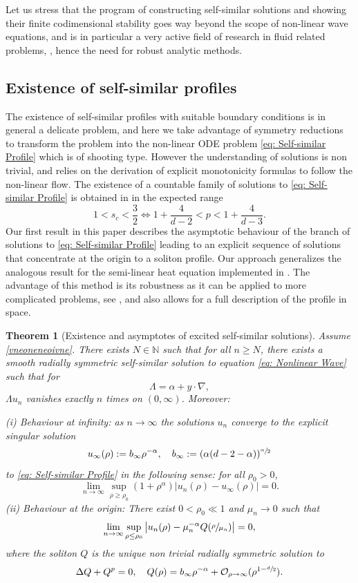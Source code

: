 \documentclass[10pt]{amsart}
\theoremstyle{plain}
\newtheorem{theorem}{Theorem}
\theoremstyle{definition}
\begin{document}
Let us stress that the program of constructing self-similar solutions and showing their finite codimensional stability goes way beyond the scope of non-linear wave equations, and is in particular a very active field of research in fluid related problems, \cite{MRRS}, hence the need for robust analytic methods.

\subsection{Existence of self-similar profiles}

The existence of self-similar profiles with suitable boundary conditions is in general a delicate problem, and here we take advantage of symmetry reductions to transform the problem into the non-linear ODE problem \eqref{eq: Self-similar Profile} which is of shooting type. However the understanding of solutions is non trivial, and relies on the derivation of explicit monotonicity formulas to follow the non-linear flow. The existence of a countable family of solutions to \eqref{eq: Self-similar Profile} is obtained in \cite{BMW,DD} in the expected range
\begin{equation}
\label{vneoneneoivne}
1<s_c<\frac{3}{2}\iff 1+\frac{4}{d-2}<p<1+\frac{4}{d-3}.
\end{equation}
Our first result in this paper describes the asymptotic behaviour of the branch of solutions to \eqref{eq: Self-similar Profile} leading to an explicit sequence of solutions that concentrate at the origin to a soliton profile. Our approach generalizes the analogous result for the semi-linear heat equation implemented in \cite{BB,CRS}. The advantage of this method is its robustness as it can be applied to more complicated problems, see \eg \cite{BMR}, and also allows for a full description of the profile in space.

\begin{theorem}[Existence and asymptotes of excited self-similar solutions]
\label{theo: Result 1}
Assume \eqref{vneoneneoivne}. There exists $N\in\mathbb N$ such that for all $n\ge N$, there exists a smooth radially symmetric self-similar solution to equation \eqref{eq: Nonlinear Wave} such that for
\[
\Lambda = \alpha+y\cdot \nabla,
\]
$\Lambda u_n$ vanishes exactly $n$ times on $(0,\infty)$. Moreover:

\emph{(i) Behaviour at infinity:} as $n\to \infty$ the solutions $u_n$ converge to the explicit singular solution
\[
u_\infty(\rho):=b_\infty\rho^{-\alpha}, \quad b_\infty:=(\alpha(d-2-\alpha))^{\sfrac{\alpha}{2}}
\]
to \eqref{eq: Self-similar Profile} in the following sense: for all $\rho_0>0$,
\[
\lim_{n\to \infty }\sup_{\rho\ge\rho_0}(1+\rho^\alpha)|u_n(\rho)-u_\infty(\rho)|=0.
\]
\emph{(ii) Behaviour at the origin:} There exist $0<\rho_0\ll1 $ and $\mu_n\to 0$ such that
\[
\lim_{n\to \infty }\sup_{\rho\le\rho_0}\big|u_n(\rho)-\mu_n^{-\alpha}Q(\sfrac{\rho}{\mu_n})\big|=0,
\]
where the soliton $Q$ is the unique non trivial radially symmetric solution to
\[
\Delta Q+Q^p=0,\quad Q(\rho)=b_\infty\rho^{-\alpha}+\mathcal O_{\rho\to\infty } (\rho^{1-\sfrac{d}{2}}).
\]
\end{theorem}
\end{document}

